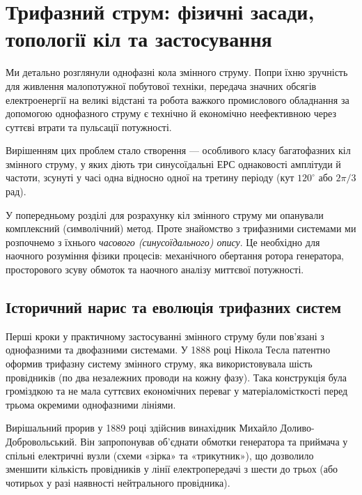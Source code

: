 \section{Трифазний струм: фізичні засади, топології кіл та застосування}

Ми детально розглянули однофазні кола змінного струму. Попри їхню зручність для живлення малопотужної побутової техніки, передача значних обсягів електроенергії на великі відстані та робота важкого промислового обладнання за допомогою однофазного струму є технічно й економічно неефективною через суттєві втрати та пульсації потужності.

Вирішенням цих проблем стало створення  --- особливого класу багатофазних кіл змінного струму, у яких діють три синусоїдальні ЕРС однаковості амплітуди й частоти, зсунуті у часі одна відносно одної на третину періоду (кут $120^\circ$ або $2\pi/3$ рад).

У попередньому розділі для розрахунку кіл змінного струму ми опанували комплексний (символічний) метод. Проте знайомство з трифазними системами ми розпочнемо з їхнього \emph{часового (синусоїдального) опису}.
%
Це необхідно для наочного розуміння фізики процесів: механічного обертання ротора генератора, просторового зсуву обмоток та наочного аналізу миттєвої потужності.


\subsection*{Історичний нарис та еволюція трифазних систем}

Перші кроки у практичному застосуванні змінного струму були пов'язані з однофазними та двофазними системами. У 1888 році Нікола Тесла патентно оформив трифазну систему змінного струму, яка використовувала шість провідників (по два незалежних проводи на кожну фазу). Така конструкція була громіздкою та не мала суттєвих економічних переваг у матеріаломісткості перед трьома окремими однофазними лініями.

Вирішальний прорив у 1889 році здійснив винахідник Михайло Доливо-Добровольський. Він запропонував об'єднати обмотки генератора та приймача у спільні електричні вузли (схеми «зірка» та «трикутник»), що дозволило зменшити кількість провідників у лінії електропередачі з шести до трьох (або чотирьох у разі наявності нейтрального провідника).


